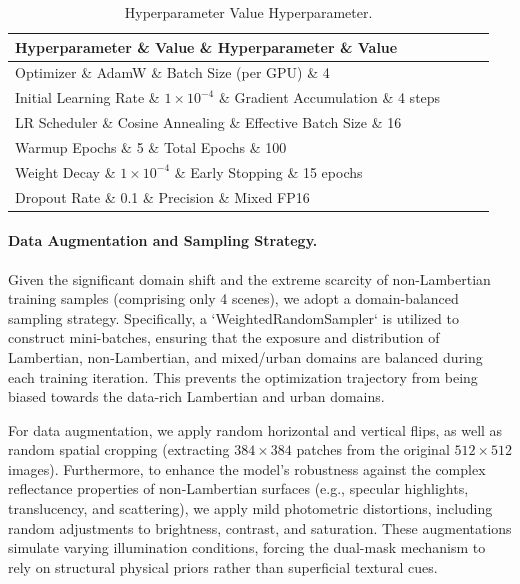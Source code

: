 \begin{table}[!t]
\caption{Hyperparameter Value Hyperparameter.}
\label{tab:table2}
\centering
\begin{tabular*}{\linewidth}{@{\extracolsep{\fill}}llll}
\toprule
Hyperparameter \& Value \& Hyperparameter \& Value \\
\midrule
Optimizer \& AdamW \& Batch Size (per GPU) \& 4 \\
Initial Learning Rate \& $1 \times 10^{-4}$ \& Gradient Accumulation \& 4 steps \\
LR Scheduler \& Cosine Annealing \& Effective Batch Size \& 16 \\
Warmup Epochs \& 5 \& Total Epochs \& 100 \\
Weight Decay \& $1 \times 10^{-4}$ \& Early Stopping \& 15 epochs \\
Dropout Rate \& 0.1 \& Precision \& Mixed FP16 \\
\bottomrule
\end{tabular*}
\end{table}
\paragraph{Data Augmentation and Sampling Strategy.}
Given the significant domain shift and the extreme scarcity of non-Lambertian training samples (comprising only 4 scenes), we adopt a domain-balanced sampling strategy. Specifically, a `WeightedRandomSampler` is utilized to construct mini-batches, ensuring that the exposure and distribution of Lambertian, non-Lambertian, and mixed/urban domains are balanced during each training iteration. This prevents the optimization trajectory from being biased towards the data-rich Lambertian and urban domains.

For data augmentation, we apply random horizontal and vertical flips, as well as random spatial cropping (extracting $384 \times 384$ patches from the original $512 \times 512$ images). Furthermore, to enhance the model's robustness against the complex reflectance properties of non-Lambertian surfaces (e.g., specular highlights, translucency, and scattering), we apply mild photometric distortions, including random adjustments to brightness, contrast, and saturation. These augmentations simulate varying illumination conditions, forcing the dual-mask mechanism to rely on structural physical priors rather than superficial textural cues.

